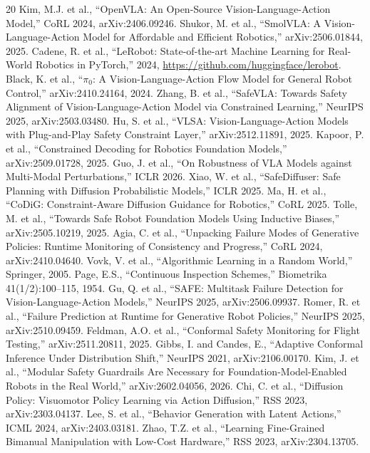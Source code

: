 \documentclass[conference]{IEEEtran}
\begin{document}
\begin{thebibliography}{20}
 Kim, M.J. et al., ``OpenVLA: An Open-Source Vision-Language-Action Model,'' CoRL 2024, arXiv:2406.09246.
 Shukor, M. et al., ``SmolVLA: A Vision-Language-Action Model for Affordable and Efficient Robotics,'' arXiv:2506.01844, 2025.
 Cadene, R. et al., ``LeRobot: State-of-the-art Machine Learning for Real-World Robotics in PyTorch,'' 2024, \url{https://github.com/huggingface/lerobot}.
 Black, K. et al., ``$\pi_0$: A Vision-Language-Action Flow Model for General Robot Control,'' arXiv:2410.24164, 2024.
 Zhang, B. et al., ``SafeVLA: Towards Safety Alignment of Vision-Language-Action Model via Constrained Learning,'' NeurIPS 2025, arXiv:2503.03480.
 Hu, S. et al., ``VLSA: Vision-Language-Action Models with Plug-and-Play Safety Constraint Layer,'' arXiv:2512.11891, 2025.
 Kapoor, P. et al., ``Constrained Decoding for Robotics Foundation Models,'' arXiv:2509.01728, 2025.
 Guo, J. et al., ``On Robustness of VLA Models against Multi-Modal Perturbations,'' ICLR 2026.
 Xiao, W. et al., ``SafeDiffuser: Safe Planning with Diffusion Probabilistic Models,'' ICLR 2025.
 Ma, H. et al., ``CoDiG: Constraint-Aware Diffusion Guidance for Robotics,'' CoRL 2025.
 Tolle, M. et al., ``Towards Safe Robot Foundation Models Using Inductive Biases,'' arXiv:2505.10219, 2025.
 Agia, C. et al., ``Unpacking Failure Modes of Generative Policies: Runtime Monitoring of Consistency and Progress,'' CoRL 2024, arXiv:2410.04640.
 Vovk, V. et al., ``Algorithmic Learning in a Random World,'' Springer, 2005.
 Page, E.S., ``Continuous Inspection Schemes,'' Biometrika 41(1/2):100--115, 1954.
 Gu, Q. et al., ``SAFE: Multitask Failure Detection for Vision-Language-Action Models,'' NeurIPS 2025, arXiv:2506.09937.
 Romer, R. et al., ``Failure Prediction at Runtime for Generative Robot Policies,'' NeurIPS 2025, arXiv:2510.09459.
 Feldman, A.O. et al., ``Conformal Safety Monitoring for Flight Testing,'' arXiv:2511.20811, 2025.
 Gibbs, I. and Candes, E., ``Adaptive Conformal Inference Under Distribution Shift,'' NeurIPS 2021, arXiv:2106.00170.
 Kim, J. et al., ``Modular Safety Guardrails Are Necessary for Foundation-Model-Enabled Robots in the Real World,'' arXiv:2602.04056, 2026.
 Chi, C. et al., ``Diffusion Policy: Visuomotor Policy Learning via Action Diffusion,'' RSS 2023, arXiv:2303.04137.
 Lee, S. et al., ``Behavior Generation with Latent Actions,'' ICML 2024, arXiv:2403.03181.
 Zhao, T.Z. et al., ``Learning Fine-Grained Bimanual Manipulation with Low-Cost Hardware,'' RSS 2023, arXiv:2304.13705.
\end{thebibliography}
\end{document}
